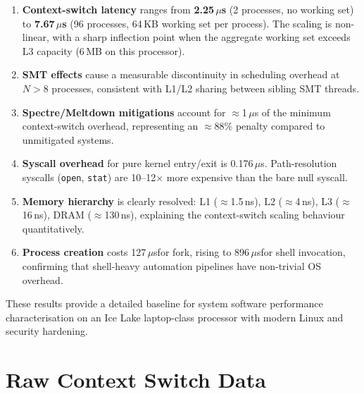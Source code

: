 \documentclass[12pt,a4paper]{article}
\newcommand{\us}{$\mu$s}
\begin{document}
\begin{enumerate}
    \item \textbf{Context-switch latency} ranges from \textbf{2.25\,\us} (2
    processes, no working set) to \textbf{7.67\,\us} (96 processes, 64\,KB
    working set per process). The scaling is non-linear, with a sharp
    inflection point when the aggregate working set exceeds L3 capacity
    (6\,MB on this processor).

    \item \textbf{SMT effects} cause a measurable discontinuity in scheduling
    overhead at $N > 8$ processes, consistent with L1/L2 sharing between
    sibling SMT threads.

    \item \textbf{Spectre/Meltdown mitigations} account for $\approx$1\,\us
    of the minimum context-switch overhead, representing an $\approx$88\%
    penalty compared to unmitigated systems.

    \item \textbf{Syscall overhead} for pure kernel entry/exit is 0.176\,\us.
    Path-resolution syscalls (\texttt{open}, \texttt{stat}) are
    10–12$\times$ more expensive than the bare null syscall.

    \item \textbf{Memory hierarchy} is clearly resolved: L1 ($\approx$1.5\,ns),
    L2 ($\approx$4\,ns), L3 ($\approx$16\,ns), DRAM ($\approx$130\,ns),
    explaining the context-switch scaling behaviour quantitatively.

    \item \textbf{Process creation} costs 127\,\us for fork, rising to
    896\,\us for shell invocation, confirming that shell-heavy automation
    pipelines have non-trivial OS overhead.
\end{enumerate}

These results provide a detailed baseline for system software performance
characterisation on an Ice Lake laptop-class processor with modern Linux and
security hardening.

\appendix

\section{Raw Context Switch Data}
\label{app:rawctx}
\end{document}
